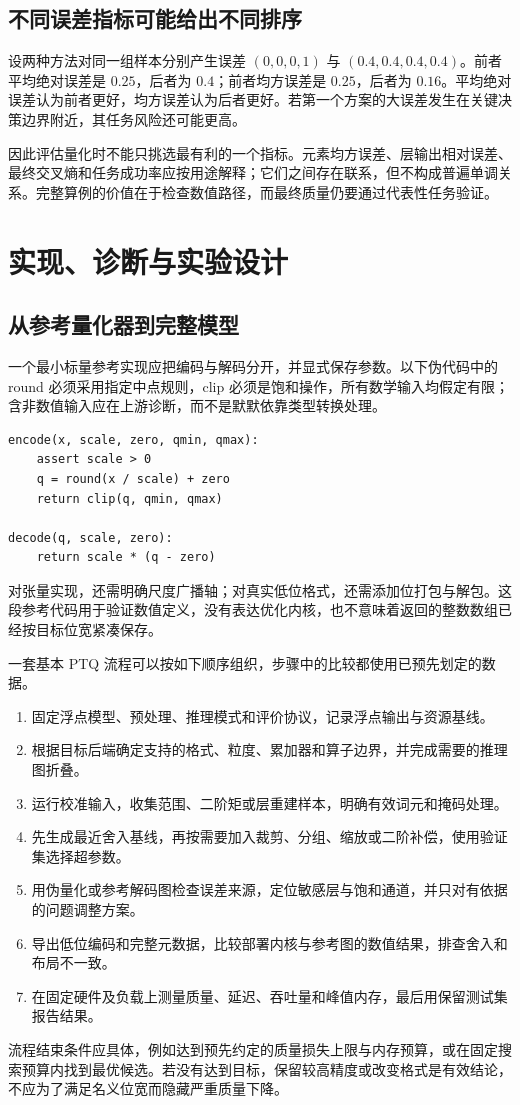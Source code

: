 \documentclass[UTF8,12pt,a4paper,fontset=fandol]{ctexart}
\begin{document}
\subsection{不同误差指标可能给出不同排序}
设两种方法对同一组样本分别产生误差 $(0,0,0,1)$ 与 $(0.4,0.4,0.4,0.4)$。前者平均绝对误差是 $0.25$，后者为 $0.4$；前者均方误差是 $0.25$，后者为 $0.16$。平均绝对误差认为前者更好，均方误差认为后者更好。若第一个方案的大误差发生在关键决策边界附近，其任务风险还可能更高。

因此评估量化时不能只挑选最有利的一个指标。元素均方误差、层输出相对误差、最终交叉熵和任务成功率应按用途解释；它们之间存在联系，但不构成普遍单调关系。完整算例的价值在于检查数值路径，而最终质量仍要通过代表性任务验证。

\section{实现、诊断与实验设计}
\label{sec:quant-practice}

\subsection{从参考量化器到完整模型}
一个最小标量参考实现应把编码与解码分开，并显式保存参数。以下伪代码中的 round 必须采用指定中点规则，clip 必须是饱和操作，所有数学输入均假定有限；含非数值输入应在上游诊断，而不是默默依靠类型转换处理。
\begin{verbatim}
encode(x, scale, zero, qmin, qmax):
    assert scale > 0
    q = round(x / scale) + zero
    return clip(q, qmin, qmax)

decode(q, scale, zero):
    return scale * (q - zero)
\end{verbatim}
对张量实现，还需明确尺度广播轴；对真实低位格式，还需添加位打包与解包。这段参考代码用于验证数值定义，没有表达优化内核，也不意味着返回的整数数组已经按目标位宽紧凑保存。

一套基本 PTQ 流程可以按如下顺序组织，步骤中的比较都使用已预先划定的数据。
\begin{enumerate}
 \item 固定浮点模型、预处理、推理模式和评价协议，记录浮点输出与资源基线。
 \item 根据目标后端确定支持的格式、粒度、累加器和算子边界，并完成需要的推理图折叠。
 \item 运行校准输入，收集范围、二阶矩或层重建样本，明确有效词元和掩码处理。
 \item 先生成最近舍入基线，再按需要加入裁剪、分组、缩放或二阶补偿，使用验证集选择超参数。
 \item 用伪量化或参考解码图检查误差来源，定位敏感层与饱和通道，并只对有依据的问题调整方案。
 \item 导出低位编码和完整元数据，比较部署内核与参考图的数值结果，排查舍入和布局不一致。
 \item 在固定硬件及负载上测量质量、延迟、吞吐量和峰值内存，最后用保留测试集报告结果。
\end{enumerate}
流程结束条件应具体，例如达到预先约定的质量损失上限与内存预算，或在固定搜索预算内找到最优候选。若没有达到目标，保留较高精度或改变格式是有效结论，不应为了满足名义位宽而隐藏严重质量下降。
\end{document}
